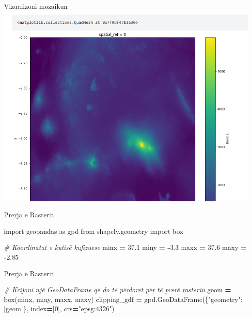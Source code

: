 \documentclass[
  ignorenonframetext,
]{beamer}
\newenvironment{Shaded}{\begin{snugshade}}{\end{snugshade}}
\newcommand{\CommentTok}[1]{\textcolor[rgb]{0.56,0.35,0.01}{\textit{#1}}}
\newcommand{\DecValTok}[1]{\textcolor[rgb]{0.00,0.00,0.81}{#1}}
\newcommand{\FloatTok}[1]{\textcolor[rgb]{0.00,0.00,0.81}{#1}}
\newcommand{\ImportTok}[1]{#1}
\newcommand{\NormalTok}[1]{#1}
\newcommand{\OperatorTok}[1]{\textcolor[rgb]{0.81,0.36,0.00}{\textbf{#1}}}
\newcommand{\StringTok}[1]{\textcolor[rgb]{0.31,0.60,0.02}{#1}}
\begin{document}
\begin{frame}{Vizualizoni mozaikun}
\protect\hypertarget{vizualizoni-mozaikun-1}{}
\includegraphics{./Figs/mosaic.png}
\end{frame}

\begin{frame}[fragile]{Prerja e Rasterit}
\protect\hypertarget{prerja-e-rasterit}{}

\begin{Shaded}
\begin{Highlighting}[]
\ImportTok{import}\NormalTok{ geopandas }\ImportTok{as}\NormalTok{ gpd}
\ImportTok{from}\NormalTok{ shapely.geometry }\ImportTok{import}\NormalTok{ box}

\CommentTok{\# Koordinatat e kutisë kufizuese}
\NormalTok{minx }\OperatorTok{=} \FloatTok{37.1}
\NormalTok{miny }\OperatorTok{=} \OperatorTok{{-}}\FloatTok{3.3}
\NormalTok{maxx }\OperatorTok{=} \FloatTok{37.6}
\NormalTok{maxy }\OperatorTok{=} \OperatorTok{{-}}\FloatTok{2.85}
\end{Highlighting}
\end{Shaded}
\end{frame}

\begin{frame}[fragile]{Prerja e Rasterit}
\protect\hypertarget{prerja-e-rasterit-1}{}

\begin{Shaded}
\begin{Highlighting}[]
\CommentTok{\# Krijoni një GeoDataFrame që do të përdoret për të prerë rasterin}
\NormalTok{geom }\OperatorTok{=}\NormalTok{ box(minx, miny, maxx, maxy)}
\NormalTok{clipping\_gdf }\OperatorTok{=}\NormalTok{ gpd.GeoDataFrame(\{}\StringTok{"geometry"}\NormalTok{: [geom]\}, index}\OperatorTok{=}\NormalTok{[}\DecValTok{0}\NormalTok{], crs}\OperatorTok{=}\StringTok{"epsg:4326"}\NormalTok{)}
\end{Highlighting}
\end{Shaded}
\end{frame}
\end{document}
